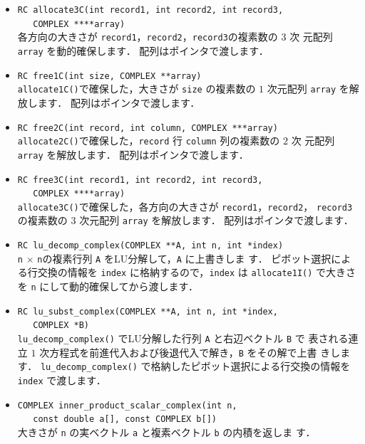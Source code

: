\begin{itemize}
\item \verb|RC allocate3C(int record1, int record2, int record3, | \\
	\verb|   COMPLEX ****array)| \ \\
各方向の大きさが \verb|record1|，\verb|record2|，\verb|record3|の複素数の $3$ 次
元配列 \verb|array| を動的確保します．
配列はポインタで渡します．

\item \verb|RC free1C(int size, COMPLEX **array)| \ \\
\verb|allocate1C()|で確保した，大きさが \verb|size| の複素数の $1$ 次元配列 
\verb|array| を解放します．
配列はポインタで渡します．

\item \verb|RC free2C(int record, int column, COMPLEX ***array)| \ \\
\verb|allocate2C()|で確保した，\verb|record| 行 \verb|column| 列の複素数の $2$ 次
元配列 \verb|array| を解放します．
配列はポインタで渡します．

\item \verb|RC free3C(int record1, int record2, int record3, | \\
	\verb|   COMPLEX ****array)| \ \\
\verb|allocate3C()|で確保した，各方向の大きさが \verb|record1|，\verb|record2|，
\verb|record3| の複素数の $3$ 次元配列 \verb|array| を解放します．
配列はポインタで渡します．

\item \verb|RC lu_decomp_complex(COMPLEX **A, int n, int *index)| \ \\
\verb|n| $\times$ \verb|n|の複素行列 \verb|A| をLU分解して，\verb|A| に上書きしま
す．
ピボット選択による行交換の情報を \verb|index| に格納するので，\verb|index| は
\verb|allocate1I()| で大きさを \verb|n| にして動的確保してから渡します．

\item \verb|RC lu_subst_complex(COMPLEX **A, int n, int *index, | \\
	\verb|   COMPLEX *B)| \ \\
\verb|lu_decomp_complex()| でLU分解した行列 \verb|A| と右辺ベクトル \verb|B| で
表される連立 $1$ 次方程式を前進代入および後退代入で解き，\verb|B| をその解で上書
きします．
\verb|lu_decomp_complex()| で格納したピボット選択による行交換の情報を 
\verb|index| で渡します．

\item \verb|COMPLEX inner_product_scalar_complex(int n, | \\
	\verb|   const double a[], const COMPLEX b[])| \ \\
大きさが \verb|n| の実ベクトル \verb|a| と複素ベクトル \verb|b| の内積を返しま
す．


\end{itemize}
